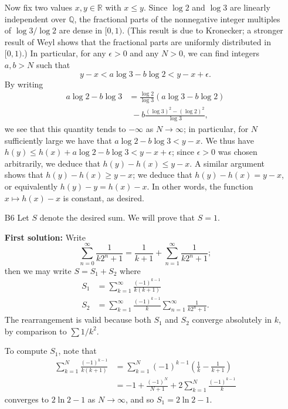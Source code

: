 \documentclass[amssymb,twocolumn,pra,10pt,aps]{revtex4-1}
\newcommand{\QQ}{\mathbb{Q}}
\newcommand{\RR}{\mathbb{R}}
\begin{document}
\begin{itemize}
Now fix two values $x,y \in \RR$ with $x \leq y$. Since $\log 2$ and $\log 3$ are linearly independent over $\QQ$, the fractional parts of the nonnegative integer multiples of $\log 3/\log 2$ are dense in $[0,1)$. (This result is due to Kronecker; a stronger result of Weyl shows that the fractional parts are uniformly distributed in $[0,1)$.)
In particular, for any $\epsilon > 0$ and any $N > 0$, we can find integers $a,b > N$ such that
\[
y-x < a \log 3 - b \log 2 < y-x + \epsilon.
\]
By writing
\begin{align*}
a \log 2 - b \log 3& = \frac{\log 2}{\log 3}(a \log 3 - b \log 2) \\
&\,\,- b \frac{(\log 3)^2 - (\log 2)^2}{\log 3},
\end{align*}
we see that this quantity tends to $-\infty$ as $N \to \infty$; in particular, for $N$ sufficiently large we have that $a \log 2 - b \log 3 < y-x$. We thus have
$h(y) \leq h(x) + a \log 2 - b \log 3 < y-x + \epsilon$; since $\epsilon>0$ was chosen arbitrarily, we deduce that $h(y)-h(x) \leq y-x$. A similar argument shows that $h(y)-h(x) \geq y-x$; we deduce that $h(y) - h(x) = y-x$, or equivalently $h(y)-y = h(x) - x$. In other words, the function $x \mapsto h(x) - x$ is constant, as desired.

\item[B6]
Let $S$ denote the desired sum. We will prove that $S=1$.

\noindent
\textbf{First solution:}
Write
\[
\sum_{n=0}^\infty \frac{1}{k2^n+1} = \frac{1}{k+1} + \sum_{n=1}^\infty \frac{1}{k2^n+1}; 
\]
then we may write $S = S_1+S_2$ where 
\begin{align*} 
S_1 &= \sum_{k=1}^\infty \frac{(-1)^{k-1}}{k(k+1)} \\
S_2 &= \sum_{k=1}^\infty \frac{(-1)^{k-1}}{k} \sum_{n=1}^\infty \frac{1}{k2^n+1}.
\end{align*}
The rearrangement is valid because both $S_1$ and $S_2$ converge absolutely in $k$, by comparison to $\sum 1/k^2$.

To compute $S_1$, note that 
\begin{align*}
\sum_{k=1}^N \frac{(-1)^{k-1}}{k(k+1)} &= \sum_{k=1}^N  (-1)^{k-1}\left(\frac{1}{k}-\frac{1}{k+1} \right) \\
&= -1+\frac{(-1)^N}{N+1}+2\sum_{k=1}^N \frac{(-1)^{k-1}}{k}
\end{align*}
converges to $2\ln 2-1$ as $N\to\infty$, and so $S_1 = 2\ln 2-1$.


\end{itemize}
\end{document}
